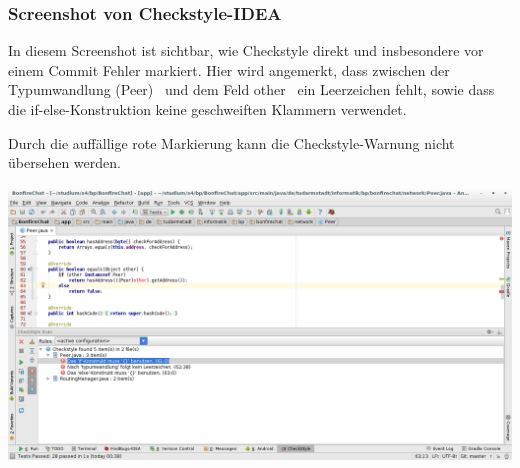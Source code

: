 





\subsubsection{Screenshot von Checkstyle-IDEA}

In diesem Screenshot ist sichtbar, wie Checkstyle direkt und insbesondere vor einem Commit Fehler markiert. Hier wird angemerkt, dass zwischen der Typumwandlung \glqq (Peer)\grqq~ und dem Feld \glqq other\grqq~ ein Leerzeichen fehlt, sowie dass die if-else-Konstruktion keine geschweiften Klammern verwendet.

Durch die auffällige rote Markierung kann die Checkstyle-Warnung nicht übersehen werden.

\includegraphics[width=17.5cm]{belege/checkstyle/checkstyle-idea-screenshot.png}
